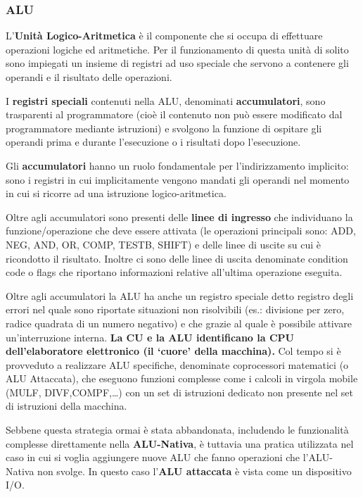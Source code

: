 \documentclass[12pt]{article}
\begin{document}
\subsubsection{ALU}
L’\textbf{Unità Logico-Aritmetica} è il componente che si occupa di effettuare operazioni logiche ed aritmetiche. Per il funzionamento di questa unità di solito sono impiegati un insieme di registri ad uso speciale che servono a contenere gli operandi e il risultato delle operazioni. \par\medskip\noindent
I \textbf{registri speciali} contenuti nella ALU, denominati \textbf{accumulatori}, sono trasparenti al programmatore (cioè il contenuto non può essere modificato dal programmatore mediante istruzioni) e svolgono la funzione di ospitare gli operandi prima e durante l’esecuzione o i risultati dopo l’esecuzione.\par\medskip\noindent
Gli \textbf{accumulatori} hanno un ruolo fondamentale per l’indirizzamento implicito: sono i registri in cui implicitamente vengono mandati gli operandi nel momento in cui si ricorre ad una istruzione logico-aritmetica.\par\medskip\noindent
Oltre agli accumulatori sono presenti delle \textbf{linee di ingresso} che individuano la funzione/operazione che deve essere attivata (le operazioni principali sono: ADD, NEG,
AND, OR, COMP, TESTB, SHIFT) e delle linee di uscite su cui è ricondotto il risultato. Inoltre ci sono delle linee di uscita denominate condition code o flags che riportano informazioni relative all’ultima operazione eseguita. \par\medskip\noindent
Oltre agli accumulatori la ALU ha anche un registro speciale detto registro degli errori nel quale sono riportate situazioni non risolvibili (es.: divisione per zero, radice quadrata di un numero negativo) e che grazie al quale è possibile attivare un’interruzione interna.
\textbf{La CU e la ALU identificano la CPU dell’elaboratore elettronico (il ‘cuore’ della macchina).} Col tempo si è provveduto a realizzare ALU specifiche, denominate coprocessori matematici (o ALU Attaccata), che eseguono funzioni complesse come i calcoli in virgola mobile (MULF, DIVF,COMPF,…) con un set di istruzioni dedicato non presente nel set di istruzioni della macchina. \par\medskip\noindent
Sebbene questa strategia ormai è stata abbandonata, includendo le funzionalità complesse direttamente nella \textbf{ALU-Nativa}, è tuttavia una pratica utilizzata nel caso in cui si voglia aggiungere nuove ALU che fanno operazioni che l’ALU-Nativa non svolge. In questo caso l’\textbf{ALU attaccata} è vista come un dispositivo I/O.\par\medskip\noindent
\end{document}
